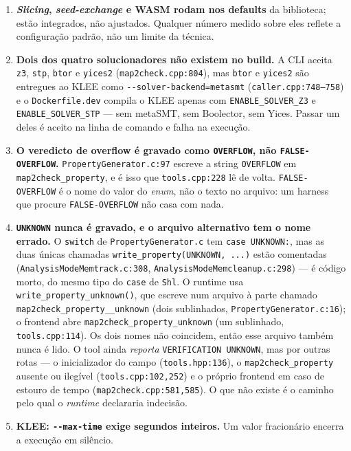 \documentclass[11pt,a4paper]{article}
\newcommand{\code}[1]{\texttt{#1}}
\newcommand{\flag}[1]{\texttt{-\/-#1}}
\newcommand{\src}[1]{{\small\texttt{#1}}}
\begin{document}
\begin{enumerate}[leftmargin=*,itemsep=3pt]
  \item \textbf{\emph{Slicing}, \emph{seed-exchange} e WASM rodam nos defaults}
        da biblioteca; estão integrados, não ajustados. Qualquer número medido
        sobre eles reflete a configuração padrão, não um limite da técnica.
  \item \textbf{Dois dos quatro solucionadores não existem no build.} A CLI
        aceita \code{z3}, \code{stp}, \code{btor} e \code{yices2}
        (\src{map2check.cpp:804}), mas \code{btor} e \code{yices2} são
        entregues ao KLEE como \code{-{}-solver-backend=metasmt}
        (\src{caller.cpp:748--758}) e o \code{Dockerfile.dev} compila o KLEE
        apenas com \code{ENABLE\_SOLVER\_Z3} e \code{ENABLE\_SOLVER\_STP} ---
        sem metaSMT, sem Boolector, sem Yices. Passar um deles é aceito na
        linha de comando e falha na execução.
  \item \textbf{O veredicto de overflow é gravado como \code{OVERFLOW}, não
        \code{FALSE-OVERFLOW}.} \src{PropertyGenerator.c:97} escreve a string
        \code{OVERFLOW} em \code{map2check\_property}, e é isso que
        \src{tools.cpp:228} lê de volta. \code{FALSE-OVERFLOW} é o nome do
        valor do \emph{enum}, não o texto no arquivo: um harness que procure
        \code{FALSE-OVERFLOW} não casa com nada.
  \item \textbf{\code{UNKNOWN} nunca é gravado, e o arquivo alternativo tem o
        nome errado.} O \code{switch} de \src{PropertyGenerator.c} tem
        \code{case UNKNOWN:}, mas as duas únicas chamadas
        \code{write\_property(UNKNOWN, ...)} estão comentadas
        (\src{AnalysisModeMemtrack.c:308},
        \src{AnalysisModeMemcleanup.c:298}) --- é código morto, do mesmo tipo
        do \code{case} de \code{Shl}. O runtime usa
        \code{write\_property\_unknown()}, que escreve num arquivo à parte
        chamado \code{map2check\_property\_\_unknown} (dois sublinhados,
        \src{PropertyGenerator.c:16}); o frontend abre
        \code{map2check\_property\_unknown} (um sublinhado,
        \src{tools.cpp:114}). Os dois nomes não coincidem, então esse arquivo
        também nunca é lido. O tool ainda \emph{reporta}
        \code{VERIFICATION UNKNOWN}, mas por outras rotas --- o inicializador
        do campo (\src{tools.hpp:136}), o \code{map2check\_property} ausente ou
        ilegível (\src{tools.cpp:102,252}) e o próprio frontend em caso de
        estouro de tempo (\src{map2check.cpp:581,585}). O que não existe é o
        caminho pelo qual o \emph{runtime} declararia indecisão.
  \item \textbf{KLEE: \flag{max-time} exige segundos inteiros.} Um valor
        fracionário encerra a execução em silêncio.
\end{enumerate}
\end{document}
